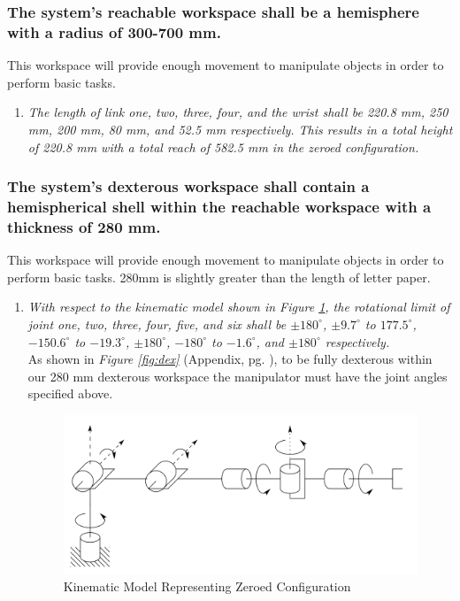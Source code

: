 \documentclass[12pt]{report}
\begin{document}
\subsubsection{The system’s reachable workspace shall be a hemisphere with a radius of 300-700 mm.}
This workspace will provide enough movement to manipulate objects in order to perform basic tasks.
\begin{enumerate}[label=\thesubsubsection.\alph*,leftmargin=3cm,font=\itshape]
  \item \textit{The length of link one, two, three, four, and the wrist shall be 220.8 mm, 250 mm, 200 mm, 80 mm, and 52.5 mm respectively. This results in a total height of 220.8 mm with a total reach of 582.5 mm in the zeroed configuration.}
\end{enumerate}

\subsubsection{The system’s dexterous workspace shall contain a hemispherical shell within the reachable workspace with a thickness of 280 mm.}
This workspace will provide enough movement to manipulate objects in order to perform basic tasks. 280mm is slightly greater than the length of letter paper.
\begin{enumerate}[label=\thesubsubsection.\alph*,leftmargin=3cm,font=\itshape]
  \item \textit{With respect to the kinematic model shown in Figure \ref{fig:zero}, the rotational limit of joint one, two, three, four, five, and six shall be \(\pm180^{\circ}\), \(\pm9.7^{\circ}\) to \(177.5^{\circ}\), \(-150.6^{\circ}\) to \(-19.3^{\circ}\), \(\pm180^{\circ}\), \(-180^{\circ}\) to \(-1.6^{\circ}\), and \(\pm180^{\circ}\) respectively.} \\
  As shown in \emph{Figure \ref{fig:dex}} (Appendix, pg. \pageref{sec:app}), to be fully dexterous within our 280 mm dexterous workspace the manipulator must have the joint angles specified above.
  \begin{figure}[htp]
    \centering
    \includegraphics[width=.75\textwidth]{zero}
    \caption{Kinematic Model Representing Zeroed Configuration \cite{robo}}
    \label{fig:zero}
  \end{figure}
\end{enumerate}
\end{document}
